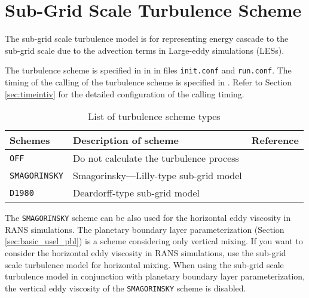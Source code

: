 
\section{Sub-Grid Scale Turbulence Scheme} \label{sec:basic_usel_turbulence}

The sub-grid scale turbulence model is for representing energy cascade to the sub-grid scale due to the advection terms in Large-eddy simulations (LESs).


The turbulence scheme is specified in  in  in files \verb|init.conf| and \verb|run.conf|. The timing of the calling of the turbulence scheme is specified in . Refer to Section \ref{sec:timeintiv} for the detailed configuration of the calling timing.

\begin{table}[h]
\begin{center}
  \caption{List of turbulence scheme types}
  \label{tab:nml_atm_tb}
  \begin{tabularx}{150mm}{lXX} \hline
    \rowcolor[gray]{0.9}  Schemes & Description of scheme & Reference\\ \hline
      \verb|OFF|          & Do not calculate the turbulence process &  \\
      \verb|SMAGORINSKY|  & Smagorinsky—Lilly-type sub-grid model & \citet{smagorinsky_1963,lilly_1962,Brown_etal_1994,Scotti_1993} \\
      \verb|D1980|        & Deardorff-type sub-grid model & \citet{Deardorff_1980} \\
    \hline
  \end{tabularx}
\end{center}
\end{table}

The \verb|SMAGORINSKY| scheme can be also used for the horizontal eddy viscosity in RANS simulations.
The planetary boundary layer parameterization (Section \ref{sec:basic_usel_pbl}) is a scheme considering only vertical mixing.
If you want to consider the horizontal eddy viscosity in RANS simulations,
use the sub-grid scale turbulence model for horizontal mixing.
When using the sub-grid scale turbulence model in conjunction with planetary boundary layer parameterization, the vertical eddy viscosity of the \verb|SMAGORINSKY| scheme is disabled.
